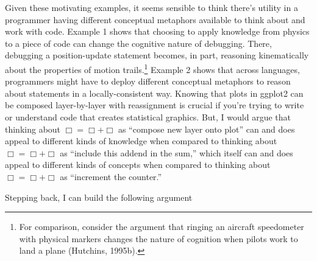 Given these motivating examples, it seems sensible to think there's
utility in a programmer having different conceptual metaphors available
to think about and work with code. Example 1 shows that choosing to
apply knowledge from physics to a piece of code can change the cognitive
nature of debugging. There, debugging a position-update statement
becomes, in part, reasoning kinematically about the properties of motion
trails.\footnote{For comparison, consider the argument that ringing an
  aircraft speedometer with physical markers changes the nature of
  cognition when pilots work to land a plane (Hutchins, 1995b).} Example
2 shows that across languages, programmers might have to deploy
different conceptual metaphors to reason about statements in a
locally-consistent way. Knowing that plots in ggplot2 can be composed
layer-by-layer with reassignment is crucial if you're trying to write or
understand code that creates statistical graphics. But, I would argue
that thinking about $\Box = \Box + \Box$ as ``compose new layer onto plot'' can and
does appeal to different kinds of knowledge when compared to thinking
about $\Box = \Box + \Box$ as ``include this addend in the sum,'' which itself can
and does appeal to different kinds of concepts when compared to thinking
about $\Box = \Box + \Box$ as ``increment the counter.''

Stepping back, I can build the following argument

